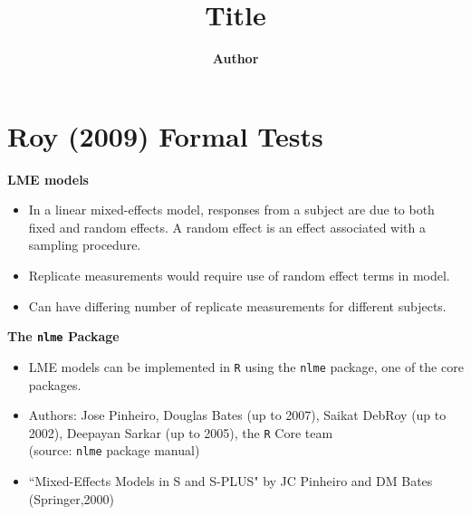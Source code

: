 \documentclass[compress]{beamer}        %
\title
{
{\huge Title\\[0.3cm] }
}
\author[Kevin O'Brien]{{\bf Author}}
\institute[University of Limerick, Maths \& Stats Dept]{}
\date{}
\makeatletter
\newcommand{\tcb}{\textcolor{beamer@blendedblue}}
\makeatother
\begin{document}










\section{Roy (2009) Formal Tests}
\begin{frame}{\bf \tcb{LME models}}
\begin{itemize}\itemsep0.7cm
\item In a linear mixed-effects model, responses from a subject are due to both fixed and random
effects. A random effect is an effect associated with a sampling procedure.
\item Replicate measurements would require use of random effect terms in model.
\item Can have differing number of replicate measurements for different subjects.
\end{itemize}
\end{frame}
\begin{frame}{\bf \tcb{The \texttt{nlme} Package}}

\begin{itemize}
\item LME models can be implemented in \texttt{R} using the \texttt{nlme} package, one of the core packages.\\
\item Authors: Jose Pinheiro, Douglas Bates (up to 2007), Saikat
DebRoy (up to 2002), Deepayan Sarkar (up to 2005), the \texttt{R} Core team \\(source: \texttt{nlme} package manual)\\
\item ``Mixed-Effects Models in S and S-PLUS" by JC Pinheiro and DM Bates (Springer,2000)

\end{itemize}

\end{frame}
\end{document}
